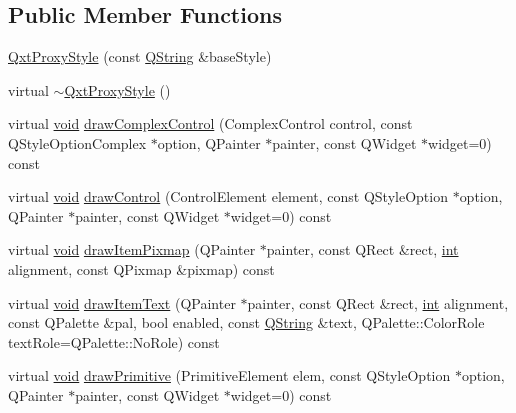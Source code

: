 \subsection*{Public Member Functions}
\begin{DoxyCompactItemize}
\item 
\hyperlink{class_qxt_proxy_style_abaf2879916f0cae9d90aea8caedeb5f7}{Qxt\-Proxy\-Style} (const \hyperlink{group___u_a_v_objects_plugin_gab9d252f49c333c94a72f97ce3105a32d}{Q\-String} \&base\-Style)
\item 
virtual \hyperlink{class_qxt_proxy_style_aa0fa2a8509bd90acf844736d73dff9ec}{$\sim$\-Qxt\-Proxy\-Style} ()
\item 
virtual \hyperlink{group___u_a_v_objects_plugin_ga444cf2ff3f0ecbe028adce838d373f5c}{void} \hyperlink{class_qxt_proxy_style_a349d5cec91063aa8ecad54fe20545f30}{draw\-Complex\-Control} (Complex\-Control control, const Q\-Style\-Option\-Complex $\ast$option, Q\-Painter $\ast$painter, const Q\-Widget $\ast$widget=0) const 
\item 
virtual \hyperlink{group___u_a_v_objects_plugin_ga444cf2ff3f0ecbe028adce838d373f5c}{void} \hyperlink{class_qxt_proxy_style_ad7450c1b1dc995ea865c9a451a8589f4}{draw\-Control} (Control\-Element element, const Q\-Style\-Option $\ast$option, Q\-Painter $\ast$painter, const Q\-Widget $\ast$widget=0) const 
\item 
virtual \hyperlink{group___u_a_v_objects_plugin_ga444cf2ff3f0ecbe028adce838d373f5c}{void} \hyperlink{class_qxt_proxy_style_aaeaf8ef782f3f2ca1d6e8fc514ad63be}{draw\-Item\-Pixmap} (Q\-Painter $\ast$painter, const Q\-Rect \&rect, \hyperlink{ioapi_8h_a787fa3cf048117ba7123753c1e74fcd6}{int} alignment, const Q\-Pixmap \&pixmap) const 
\item 
virtual \hyperlink{group___u_a_v_objects_plugin_ga444cf2ff3f0ecbe028adce838d373f5c}{void} \hyperlink{class_qxt_proxy_style_a14d2bdc0ecefdc9aea904f1a8de6070b}{draw\-Item\-Text} (Q\-Painter $\ast$painter, const Q\-Rect \&rect, \hyperlink{ioapi_8h_a787fa3cf048117ba7123753c1e74fcd6}{int} alignment, const Q\-Palette \&pal, bool enabled, const \hyperlink{group___u_a_v_objects_plugin_gab9d252f49c333c94a72f97ce3105a32d}{Q\-String} \&text, Q\-Palette\-::\-Color\-Role text\-Role=Q\-Palette\-::\-No\-Role) const 
\item 
virtual \hyperlink{group___u_a_v_objects_plugin_ga444cf2ff3f0ecbe028adce838d373f5c}{void} \hyperlink{class_qxt_proxy_style_a352bd51ceed6f32af12fdc6e40793617}{draw\-Primitive} (Primitive\-Element elem, const Q\-Style\-Option $\ast$option, Q\-Painter $\ast$painter, const Q\-Widget $\ast$widget=0) const 

\end{DoxyCompactItemize}
